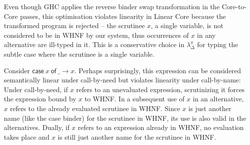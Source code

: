 \documentclass[acmsmall,review,anonymous,screen]{acmart}
\newcommand{\llet}[2]{\mathsf{let}~#1~\mathsf{in}~#2}
\newcommand{\lletrec}[2]{\mathsf{letrec}~#1~\mathsf{in}~#2}
\newcommand{\ccase}[2]{\mathsf{case}~#1~\mathsf{of}~#2}
\begin{document}
%
%
%
Even though GHC applies the reverse binder swap transformation in the
Core-to-Core passes, this optimisation violates linearity in Linear Core
because the transformed program is rejected -- the scrutinee $x$, a single
variable, is not considered to be in WHNF by our system, thus occurrences of
$x$ in any alternative are ill-typed in it. This is a conservative choice in $\lambda^\pi_\Delta$ for
typing the subtle case where the scrutinee is a single variable.

Consider $\ccase{x}{\_ \to x}$. Perhaps surprisingly, this expression can be
considered semantically linear under call-by-need but violates
linearity under call-by-name:
%
Under call-by-need, if $x$ refers to an unevaluated expression, scrutinizing it forces the expression
bound by $x$ to WHNF. In a subsequent use of
$x$ in an alternative, $x$ refers to the already evaluated scrutinee in WHNF.
Since $x$ is just another name (like the case binder) for the scrutinee in
WHNF, its use is also valid in the alternatives.
%
Dually, if $x$ refers to an expression already in WHNF, no evaluation takes
place and $x$ is still just another name for the scrutinee in WHNF.
\end{document}
